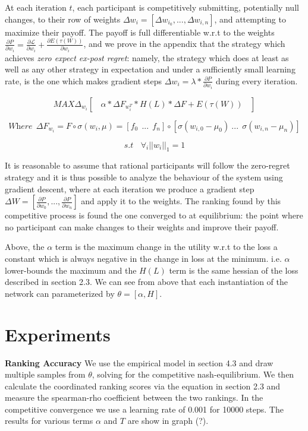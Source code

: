 \documentclass{article}
\begin{document}
At each iteration $t$, each participant is competitively submitting, potentially null changes, to their row of weights $\Delta w_i = [\Delta w_{i_0}, ..., \Delta w_{i, n}]$, and attempting to maximize their payoff. The payoff is full differentiable w.r.t to the weights $\frac{\partial P}{\partial w_i} = \frac{\partial \mathcal{L}}{\partial w_i} + \frac{\partial E(\tau(W))}{\partial w_i}$, and we prove in the appendix that the strategy which achieves \textit{zero expect ex-post regret}: namely, the strategy which does at least as well as any other strategy in expectation and under a sufficiently small learning rate, is the one which makes gradient steps $\Delta w_i = \lambda * \frac{\partial P}{\partial w_i}$ during every iteration.
\smallskip

\[ \textit{MAX} \Delta_w_i [ \ \ \ \ \alpha * \Delta F_w_i^T * H(L) * \Delta F  + E(\tau(W)) \ \ \ \ ] \]

\[ \textit{Where} \ \ \Delta F_w_i = F \circ \sigma(w_i, \mu) = [f_0 \ \ ... \ \ f_n] \circ [\sigma(w_{i,0} - \mu_0) \   ... \ \ \sigma(w_{i,n} - \mu_n)] \]

\[ \textit{s.t} \ \ \ \  \forall_i || w_i ||_1 = 1\]

It is reasonable to assume that rational participants will follow the zero-regret strategy and it is thus possible to analyze the behaviour of the system using gradient descent, where at each iteration we produce a gradient step $\Delta W = [\frac{\partial P}{\partial w_0}, ..., \frac{\partial P}{\partial w_n}]$ and apply it to the weights. The ranking found by this competitive process is found the one converged to at equilibrium: the point where no participant can make changes to their weights and improve their payoff.


Above, the $\alpha$ term is the maximum change in the utility w.r.t to the loss a constant which is always negative in the change in loss at the minimum. i.e. $\alpha$ lower-bounds the maximum and the $H(L)$ term is the same hessian of the loss described in section 2.3. We can see from above that each instantiation of the network can parameterized by $\theta = [\alpha, H]$.

\section{Experiments}

\textbf{Ranking Accuracy} We use the empirical model in section 4.3 and draw multiple samples from $\theta$, solving for the competitive nash-equilibrium. We then calculate the coordinated ranking scores via the equation in section 2.3 and measure the spearman-rho coefficient between the two rankings. In the competitive convergence we use a learning rate of 0.001 for 10000 steps. The results for various terms $\alpha$ and $T$ are show in graph (?). 
\smallskip
\end{document}
